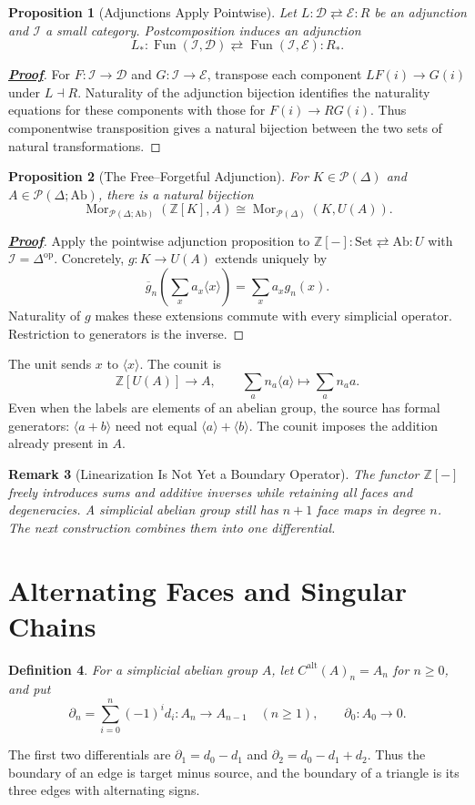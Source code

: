 \documentclass[11pt]{article}
\newcommand{\proofdest}{}
\newcommand{\claim}[1]{\def\proofdest{proof:#1}\hypertarget{statement:#1}{}}
\theoremstyle{linked}
\newtheorem{proposition}{Proposition}[section]
\theoremstyle{plainlecture}
\newtheorem{definition}[proposition]{Definition}
\newtheorem{remark}[proposition]{Remark}
\newenvironment{linkedproof}[1]{\hypertarget{proof:#1}{}\begin{proof}[\normalfont\bfseries\hyperlink{statement:#1}{Proof}]}{\end{proof}}
\newcommand{\Z}{\mathbb Z}
\newcommand{\Mor}{\operatorname{Mor}}
\newcommand{\PSh}{\mathcal{P}}
\newcommand{\Fun}{\operatorname{Fun}}
\newcommand{\Set}{\mathrm{Set}}
\newcommand{\Ab}{\mathrm{Ab}}
\newcommand{\C}{C^{\mathrm{alt}}}
\begin{document}
\claim{pointwise-adjunction}
\begin{proposition}[Adjunctions Apply Pointwise]
Let $L:\mathcal D\rightleftarrows\mathcal E:R$ be an adjunction and $\mathcal I$ a small category. Postcomposition induces an adjunction
\[
L_*:\Fun(\mathcal I,\mathcal D)\rightleftarrows
\Fun(\mathcal I,\mathcal E):R_*.
\]
\end{proposition}
\begin{linkedproof}{pointwise-adjunction}
For $F:\mathcal I\to\mathcal D$ and $G:\mathcal I\to\mathcal E$, transpose each component $LF(i)\to G(i)$ under $L\dashv R$. Naturality of the adjunction bijection identifies the naturality equations for these components with those for $F(i)\to RG(i)$. Thus componentwise transposition gives a natural bijection between the two sets of natural transformations.
\end{linkedproof}

\claim{free}
\begin{proposition}[The Free--Forgetful Adjunction]
For $K\in\PSh(\Delta)$ and $A\in\PSh(\Delta;\Ab)$, there is a natural bijection
\[
\Mor_{\PSh(\Delta;\Ab)}(\Z[K],A)\cong\Mor_{\PSh(\Delta)}(K,U(A)).
\]
\end{proposition}
\begin{linkedproof}{free}
Apply the pointwise adjunction proposition to $\Z[-]:\Set\rightleftarrows\Ab:U$ with $\mathcal I=\Delta^{\mathrm{op}}$. Concretely, $g:K\to U(A)$ extends uniquely by
\[
\overline g_n\left(\sum_x a_x\langle x\rangle\right)=\sum_x a_xg_n(x).
\]
Naturality of $g$ makes these extensions commute with every simplicial operator. Restriction to generators is the inverse.
\end{linkedproof}
The unit sends $x$ to $\langle x\rangle$. The counit is
\[
\Z[U(A)]\to A,\qquad
\sum_a n_a\langle a\rangle\longmapsto\sum_a n_a a.
\]
Even when the labels are elements of an abelian group, the source has formal generators: $\langle a+b\rangle$ need not equal $\langle a\rangle+\langle b\rangle$. The counit imposes the addition already present in $A$.

\begin{remark}[Linearization Is Not Yet a Boundary Operator]
The functor $\Z[-]$ freely introduces sums and additive inverses while retaining all faces and degeneracies. A simplicial abelian group still has $n+1$ face maps in degree $n$. The next construction combines them into one differential.
\end{remark}

\section{Alternating Faces and Singular Chains}
\begin{definition}
For a simplicial abelian group $A$, let $\C(A)_n=A_n$ for $n\geq0$, and put
\[
\partial_n=\sum_{i=0}^n(-1)^i d_i:A_n\to A_{n-1}\quad(n\geq1),
\qquad \partial_0:A_0\to0.
\]
\end{definition}
The first two differentials are $\partial_1=d_0-d_1$ and $\partial_2=d_0-d_1+d_2$. Thus the boundary of an edge is target minus source, and the boundary of a triangle is its three edges with alternating signs.
\end{document}
